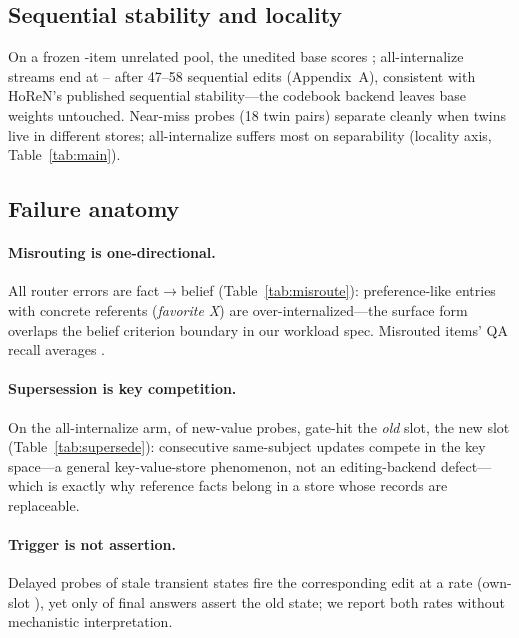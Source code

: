 \documentclass{article}
\begin{document}
\subsection{Sequential stability and locality}
\label{sec:results-seq}

On a frozen \SeqPoolN-item unrelated pool, the unedited base scores \SeqBase; all-internalize streams end at \SeqStwoEndMin--\SeqStwoEndMax{} after 47--58 sequential edits (Appendix~A), consistent with HoReN's published sequential stability---the codebook backend leaves base weights untouched. Near-miss probes (18 twin pairs) separate cleanly when twins live in different stores; all-internalize suffers most on separability (locality axis, Table~\ref{tab:main}).

\subsection{Failure anatomy}
\label{sec:results-anatomy}

\paragraph{Misrouting is one-directional.} All \NMisroutes{} router errors are fact$\to$belief (Table~\ref{tab:misroute}): preference-like entries with concrete referents (\emph{favorite X}) are over-internalized---the surface form overlaps the belief criterion boundary in our workload spec. Misrouted items' QA recall averages \MisrouteRecall.

\paragraph{Supersession is key competition.} On the all-internalize arm, of \SupTotal{} new-value probes, \SupOld{} gate-hit the \emph{old} slot, \SupNew{} the new slot (Table~\ref{tab:supersede}): consecutive same-subject updates compete in the key space---a general key-value-store phenomenon, not an editing-backend defect---which is exactly why reference facts belong in a store whose records are replaceable.

\paragraph{Trigger is not assertion.} Delayed probes of stale transient states fire the corresponding edit at a \TransientTrigger{} rate (own-slot \TransientOwnSlot), yet only \TransientAssert{} of final answers assert the old state; we report both rates without mechanistic interpretation.
\end{document}

